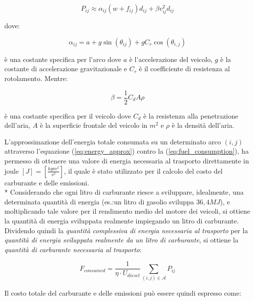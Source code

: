 	\begin{equation}
		\label{eq:energy_approx}
		P_{ij} \approx \alpha_{ij}(w + f_{ij})d_{ij} + \beta v_{ij}^2 d_{ij}
	\end{equation}

	dove:

	\begin{equation}
		\label{eq:slope_param}
		\alpha_{ij} = a + g\sin(\theta_{ij}) + gC_r \cos(\theta_{i,j})
	\end{equation}

	è una costante specifica per l’arco dove $a$ è l’accelerazione del veicolo, $g$ è la costante di accelerazione gravitazionale e $C_{r}$ è il coefficiente di resistenza al rotolamento. Mentre:

	\begin{equation}
		\label{eq:vehicle_param}
		\beta = \frac{1}{2}C_d A \rho
	\end{equation}

	è una costante specifica per il veicolo dove $C_{d}$ è la resistenza alla penetrazione dell’aria, $A$ è la superficie frontale del veicolo in $m^2$ e $\rho$ è la densità dell’aria.

	L’approssimazione dell’energia totale consumata su un determinato arco $(i,j)$ attraverso l’equazione (\ref{eq:energy_approx}) contro la (\ref{eq:fuel_consumption}), ha permesso di ottenere una valore di energia necessaria al trasporto direttamente in joule $[J] = \left[ \frac{kg m^2}{s^2} \right]$, il quale è stato utilizzato per il calcolo del costo del carburante e delle emissioni. \\*
	Considerando che ogni litro di carburante riesce a sviluppare, idealmente, una determinata quantità di energia (es.:un litro di gasolio sviluppa $36,4 MJ$), e moltiplicando tale valore per il rendimento medio del motore dei veicoli, si ottiene la quantità di energia sviluppata realmente impiegando un litro di carburante. Dividendo quindi la \emph{quantità complessiva di energia necessaria al trasporto} per la \emph{quantità di energia sviluppata realmente da un litro di carburante}, si ottiene la \emph{quantità di carburante necessaria al trasporto}:

	\begin{equation}
		\label{eq:fuel_consumed}
		F_{consumed} = \frac{1}{\eta \cdot U_{diesel}} \sum_{(i,j) \in \mathcal{A}} P_{ij} 
	\end{equation}

	Il costo totale del carburante e delle emissioni può essere quindi espresso come:


